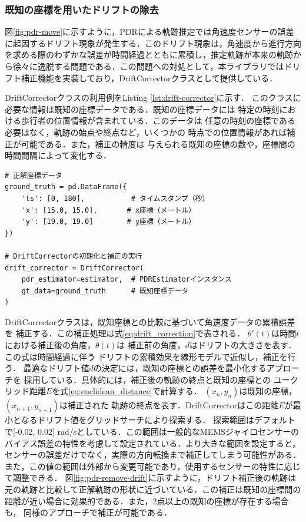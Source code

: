 \subsubsection{既知の座標を用いたドリフトの除去}


図\ref{fig:pdr-move}に示すように，PDRによる軌跡推定では角速度センサーの誤差に起因するドリフト現象が発生する．このドリフト現象は，角速度から進行方向を求める際のわずかな誤差が時間経過とともに累積し，推定軌跡が本来の軌跡から徐々に逸脱する問題である．この問題への対処として，本ライブラリではドリフト補正機能を実装しており，DriftCorrectorクラスとして提供している．


DriftCorrectorクラスの利用例をListing \ref{lst:drift-corrector}に示す．
このクラスに必要な情報は既知の座標データである．既知の座標データには
特定の時刻における歩行者の位置情報が含まれている．このデータは
任意の時刻の座標である必要はなく，軌跡の始点や終点など，いくつかの
時点での位置情報があれば補正が可能である．また，補正の精度は
与えられる既知の座標の数や，座標間の時間間隔によって変化する．


\begin{lstlisting}[caption={DriftCorrectorの使用例},label=lst:drift-corrector,float=h]
# 正解座標データ
ground_truth = pd.DataFrame({
    'ts': [0, 180],           # タイムスタンプ（秒）
    'x': [15.0, 15.0],       # x座標（メートル）
    'y': [19.0, 19.0]        # y座標（メートル）
})

# DriftCorrectorの初期化と補正の実行
drift_corrector = DriftCorrector(
    pdr_estimator=estimator,  # PDREstimatorインスタンス
    gt_data=ground_truth      # 既知座標データ
)
\end{lstlisting}

DriftCorrectorクラスは，既知座標との比較に基づいて角速度データの累積誤差を
補正する．この補正処理は式\eqref{eq:drift_correction}で表される．
$\theta'(t)$は時間$t$における補正後の角度，$\theta(t)$は
補正前の角度，$d$はドリフトの大きさを表す．この式は時間経過に伴う
ドリフトの累積効果を線形モデルで近似し，補正を行う．
最適なドリフト値$d$の決定には，既知の座標との誤差を最小化するアプローチを
採用している．具体的には，補正後の軌跡の終点と既知の座標との
ユークリッド距離$E$を式\eqref{eq:euclidean_distance}で計算する．
$(x_n, y_n)$は既知の座標，$(x_{n+1}, y_{n+1})$は補正された
軌跡の終点を表す．DriftCorrectorはこの距離$E$が最小となるドリフト値をグリッドサーチにより探索する．
探索範囲はデフォルトで[-0.02, 0.02] rad/sとしている．この範囲は一般的なMEMSジャイロセンサーの
バイアス誤差の特性を考慮して設定されている．より大きな範囲を設定すると，
センサーの誤差だけでなく，実際の方向転換まで補正してしまう可能性がある．
また，この値の範囲は外部から変更可能であり，使用するセンサーの特性に応じて調整できる．
図\ref{fig:pdr-remove-drift}に示すように，ドリフト補正後の軌跡は
元の軌跡と比較して正解軌跡の形状に近づいている．この補正は既知の座標間の
距離が近い場合に効果的である．また，2点以上の既知の座標が存在する場合も，
同様のアプローチで補正が可能である．

